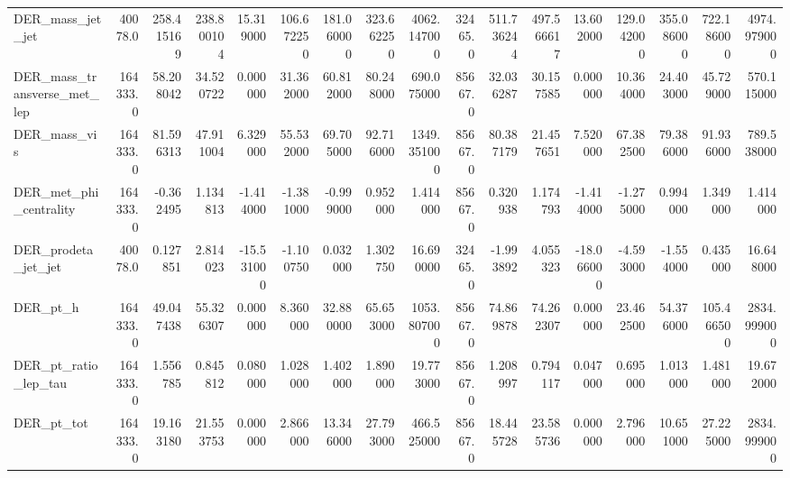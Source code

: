 \begin{table}[ht]
\begin{tabular}{lrrrrrrrrrrrrrrrr}
		DER\_mass\_jet\_jet            &   40078.0 &     258.415169 &    238.800104 &      15.319000 &     106.672250 &     181.060000 &     323.662250 &    4062.147000 &  32465.0 &     511.736244 &    497.566617 &      13.602000 &     129.042000 &     355.086000 &     722.186000 &    4974.979000 \\
		DER\_mass\_transverse\_met\_lep &  164333.0 &      58.208042 &     34.520722 &       0.000000 &      31.362000 &      60.812000 &      80.248000 &     690.075000 &  85667.0 &      32.036287 &     30.157585 &       0.000000 &      10.364000 &      24.403000 &      45.729000 &     570.115000 \\
		DER\_mass\_vis                &  164333.0 &      81.596313 &     47.911004 &       6.329000 &      55.532000 &      69.705000 &      92.716000 &    1349.351000 &  85667.0 &      80.387179 &     21.457651 &       7.520000 &      67.382500 &      79.386000 &      91.936000 &     789.538000 \\
		DER\_met\_phi\_centrality      &  164333.0 &      -0.362495 &      1.134813 &      -1.414000 &      -1.381000 &      -0.999000 &       0.952000 &       1.414000 &  85667.0 &       0.320938 &      1.174793 &      -1.414000 &      -1.275000 &       0.994000 &       1.349000 &       1.414000 \\
		DER\_prodeta\_jet\_jet         &   40078.0 &       0.127851 &      2.814023 &     -15.531000 &      -1.100750 &       0.032000 &       1.302750 &      16.690000 &  32465.0 &      -1.993892 &      4.055323 &     -18.066000 &      -4.593000 &      -1.554000 &       0.435000 &      16.648000 \\
		DER\_pt\_h                    &  164333.0 &      49.047438 &     55.326307 &       0.000000 &       8.360000 &      32.880000 &      65.653000 &    1053.807000 &  85667.0 &      74.869878 &     74.262307 &       0.000000 &      23.462500 &      54.376000 &     105.466500 &    2834.999000 \\
		DER\_pt\_ratio\_lep\_tau        &  164333.0 &       1.556785 &      0.845812 &       0.080000 &       1.028000 &       1.402000 &       1.890000 &      19.773000 &  85667.0 &       1.208997 &      0.794117 &       0.047000 &       0.695000 &       1.013000 &       1.481000 &      19.672000 \\
		DER\_pt\_tot                  &  164333.0 &      19.163180 &     21.553753 &       0.000000 &       2.866000 &      13.346000 &      27.793000 &     466.525000 &  85667.0 &      18.445728 &     23.585736 &       0.000000 &       2.796000 &      10.651000 &      27.225000 &    2834.999000 \\

\end{tabular}
\end{table}
